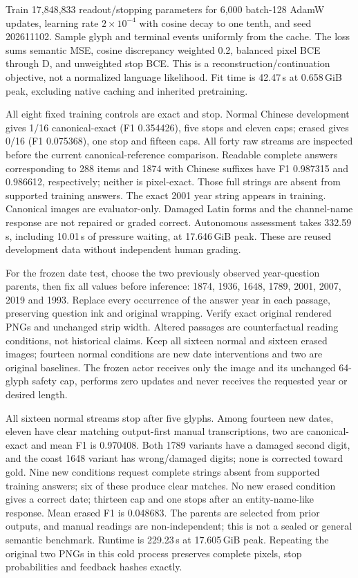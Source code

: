 \documentclass[10pt,a4paper]{article}
\begin{document}
Train 17,848,833 readout/stopping parameters for 6,000 batch-128 AdamW updates,
learning rate $2\times10^{-4}$ with cosine decay to one tenth, and seed
202611102. Sample glyph and terminal events uniformly from the cache. The
loss sums semantic MSE, cosine discrepancy weighted 0.2, balanced pixel BCE
through D, and unweighted stop BCE. This is a reconstruction/continuation
objective, not a normalized language likelihood. Fit time is 42.47\,s at
0.658\,GiB peak, excluding native caching and inherited pretraining.

All eight fixed training controls are exact and stop. Normal Chinese
development gives 1/16 canonical-exact (F1 0.354426), five stops and eleven
caps; erased gives 0/16 (F1 0.075368), one stop and fifteen caps. All forty
raw streams are inspected before the current canonical-reference comparison.
Readable complete answers corresponding to 288 items and 1874 with Chinese
suffixes have F1 0.987315 and 0.986612, respectively; neither is pixel-exact.
Those full strings are absent from supported training answers. The exact
2001 year string appears in training. Canonical images are evaluator-only.
Damaged Latin forms and the channel-name response are not repaired or graded
correct. Autonomous assessment takes 332.59\,s, including 10.01\,s of pressure
waiting, at 17.646\,GiB peak. These are reused development data without
independent human grading.

For the frozen date test, choose the two previously observed year-question
parents, then fix all values before inference: 1874, 1936, 1648, 1789, 2001,
2007, 2019 and 1993. Replace every occurrence of the answer year in each
passage, preserving question ink and original wrapping. Verify exact original
rendered PNGs and unchanged strip width. Altered passages are counterfactual
reading conditions, not historical claims. Keep all sixteen normal and
sixteen erased images; fourteen normal conditions are new date interventions
and two are original baselines. The frozen actor receives only the image and
its unchanged 64-glyph safety cap, performs zero updates and never receives
the requested year or desired length.

All sixteen normal streams stop after five glyphs. Among fourteen new dates,
eleven have clear matching output-first manual transcriptions, two are
canonical-exact and mean F1 is 0.970408. Both 1789 variants have a damaged
second digit, and the coast 1648 variant has wrong/damaged digits; none is
corrected toward gold. Nine new conditions request complete strings absent
from supported training answers; six of these produce clear matches. No new
erased condition gives a correct date; thirteen cap and one stops after an
entity-name-like response. Mean erased F1 is 0.048683. The parents are
selected from prior outputs, and manual readings are non-independent; this
is not a sealed or general semantic benchmark. Runtime is 229.23\,s at
17.605\,GiB peak. Repeating the original two PNGs in this cold process
preserves complete pixels, stop probabilities and feedback hashes exactly.
\end{document}
